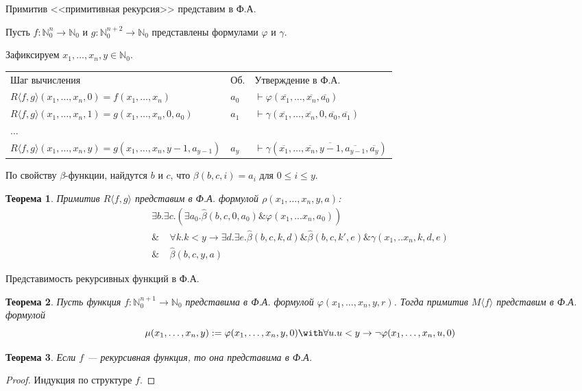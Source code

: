 \documentclass[aspectratio=169]{beamer}
\newtheorem{thm}{Теорема}[section]
\begin{document}
\begin{frame}{Примитив <<примитивная рекурсия>> представим в Ф.А.}

Пусть $f: \mathbb{N}^n_0\to\mathbb{N}_0$ и $g:\mathbb{N}^{n+2}_0\to\mathbb{N}_0$ представлены формулами $\varphi$ и $\gamma$. 

Зафиксируем $x_1, \dots, x_n, y \in \mathbb{N}_0$.\pause\vspace{0.3cm}

\begin{tabular}{lll}
Шаг вычисления & Об. & Утверждение в Ф.А.\\
$R\langle f,g\rangle (x_1,\dots,x_n,0) = f(x_1,\dots,x_n)$ & $a_0$ & $\vdash \varphi(\overline{x_1},\dots,\overline{x_n},\overline{a_0})$\\ \pause
$R\langle f,g\rangle (x_1,\dots,x_n,1) = g(x_1,\dots,x_n,0,a_0)$ & $a_1$ & $\vdash \gamma(\overline{x_1},\dots,\overline{x_n},0,\overline{a_0},\overline{a_1})$\\ \pause
$\dots$\\
$R\langle f,g\rangle (x_1,\dots,x_n,y) = g(x_1,\dots,x_n,y-1,a_{y-1})$ & $a_y$ & $\vdash \gamma(\overline{x_1},\dots,\overline{x_n},\overline{y-1},\overline{a_{y-1}},\overline{a_y})$
\end{tabular}\pause\vspace{0.3cm}

По свойству $\beta$-функции, найдутся $b$ и $c$, что
$\beta (b,c,i) = a_i$ для $0 \le i \le y$.\pause

\begin{thm}Примитив $R\langle f,g\rangle$ представим в Ф.А. формулой $\rho(x_1,\dots,x_n,y,a)$:\vspace{-0.1cm}
$$\begin{array}{l}\exists b. \exists c. (\exists a_0. \hat{\beta} (b,c,0,a_0) \& \varphi (x_1,...x_n, a_0)) \\
       \&\;\;\;\;\forall k.k < y \rightarrow \exists d . \exists e . \hat{\beta} (b,c,k,d) \& \hat{\beta} (b,c,k',e) \& \gamma (x_1,..x_n,k,d,e) \\
       \&\;\;\;\;\hat{\beta} (b,c,y,a) 
\end{array}$$
\end{thm}
\end{frame}

\begin{frame}{Представимость рекурсивных функций в Ф.А.}
\begin{thm}Пусть функция $f:\mathbb{N}^{n+1}_0 \to \mathbb{N}_0$ представима в Ф.А.
формулой $\varphi(x_1,\dots,x_{n},y,r)$. Тогда примитив $M\langle f\rangle$ представим в Ф.А. 
формулой $$\mu(x_1,\dots,x_n,y) := \varphi(x_1,\dots,x_n,y,0) \with \forall u.u < y \to \neg\varphi(x_1,\dots,x_n,u,0)$$
\end{thm}\pause

\begin{thm}Если $f$ --- рекурсивная функция, то она представима
в Ф.А.
\end{thm}
\begin{proof}Индукция по структуре $f$.
\end{proof}
\end{frame}
\end{document}
